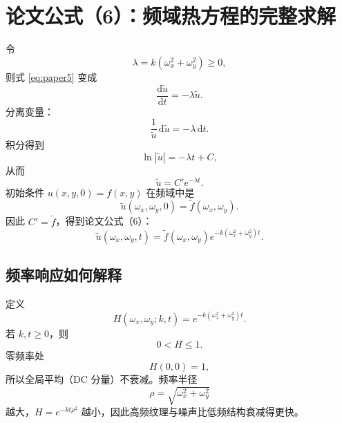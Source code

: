 \documentclass[UTF8,12pt,a4paper,fontset=none]{ctexart}
\numberwithin{equation}{section}
\newcommand{\od}{\mathrm{d}}
\begin{document}
\section{论文公式（6）：频域热方程的完整求解}

令
\begin{equation}
  \lambda=k(\omega_x^2+\omega_y^2)\ge0,
\end{equation}
则式 \eqref{eq:paper5} 变成
\begin{equation}
  \frac{\od\widetilde u}{\od t}=-\lambda\widetilde u.
\end{equation}
分离变量：
\begin{equation}
  \frac{1}{\widetilde u}\,\od\widetilde u
  =-\lambda\,\od t.
\end{equation}
积分得到
\begin{equation}
  \ln|\widetilde u|=-\lambda t+C,
\end{equation}
从而
\begin{equation}
  \widetilde u=C'e^{-\lambda t}.
\end{equation}
初始条件 $u(x,y,0)=f(x,y)$ 在频域中是
\begin{equation}
  \widetilde u(\omega_x,\omega_y,0)
  =\widetilde f(\omega_x,\omega_y).
\end{equation}
因此 $C'=\widetilde f$，得到论文公式（6）：
\begin{equation}
  \boxed{
  \widetilde u(\omega_x,\omega_y,t)
  =\widetilde f(\omega_x,\omega_y)
  e^{-k(\omega_x^2+\omega_y^2)t}
  }.
  \tag{6}
  \label{eq:paper6}
\end{equation}

\subsection{频率响应如何解释}

定义
\begin{equation}
  H(\omega_x,\omega_y;k,t)
  =e^{-k(\omega_x^2+\omega_y^2)t}.
  \label{eq:heat-response}
\end{equation}
若 $k,t\ge0$，则
\begin{equation}
  0<H\le1.
\end{equation}
零频率处
\begin{equation}
  H(0,0)=1,
\end{equation}
所以全局平均（DC 分量）不衰减。频率半径
\begin{equation}
  \rho=\sqrt{\omega_x^2+\omega_y^2}
\end{equation}
越大，$H=e^{-kt\rho^2}$ 越小，因此高频纹理与噪声比低频结构衰减得更快。
\end{document}
